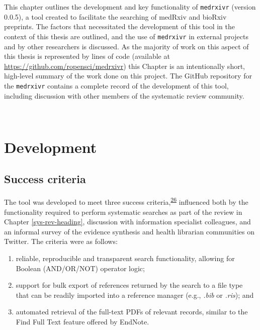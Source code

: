 \documentclass[a4paper, twoside]{templates/ociamthesis}
\begin{document}
This chapter outlines the development and key functionality of \texttt{medrxivr} (version 0.0.5), a tool created to facilitate the searching of medRxiv and bioRxiv preprints. The factors that necessitated the development of this tool in the context of this thesis are outlined, and the use of \texttt{medrxivr} in external projects and by other researchers is discussed. As the majority of work on this aspect of this thesis is represented by lines of code (available at \url{https://github.com/ropensci/medrxivr}) this Chapter is an intentionally short, high-level summary of the work done on this project. The GitHub repository for the \texttt{medrxivr} contains a complete record of the development of this tool, including discussion with other members of the systematic review community.

~





\hypertarget{development}{%
\section{Development}\label{development}}

\hypertarget{success-criteria}{%
\subsection{Success criteria}\label{success-criteria}}

The tool was developed to meet three success criteria,\textsuperscript{\protect\hyperlink{ref-wateridge1995}{26}} influenced both by the functionality required to perform systematic searches as part of the review in Chapter \ref{sys-rev-heading}, discussion with information specialist colleagues, and an informal survey of the evidence synthesis and health librarian communities on Twitter. The criteria were as follows:

\begin{enumerate}
\def\labelenumi{\arabic{enumi}.}
\item
  reliable, reproducible and transparent search functionality, allowing for Boolean (AND/OR/NOT) operator logic;
\item
  support for bulk export of references returned by the search to a file type that can be readily imported into a reference manager (e.g., \emph{.bib} or \emph{.ris}); and
\item
  automated retrieval of the full-text PDFs of relevant records, similar to the Find Full Text feature offered by EndNote.
\end{enumerate}
\end{document}
